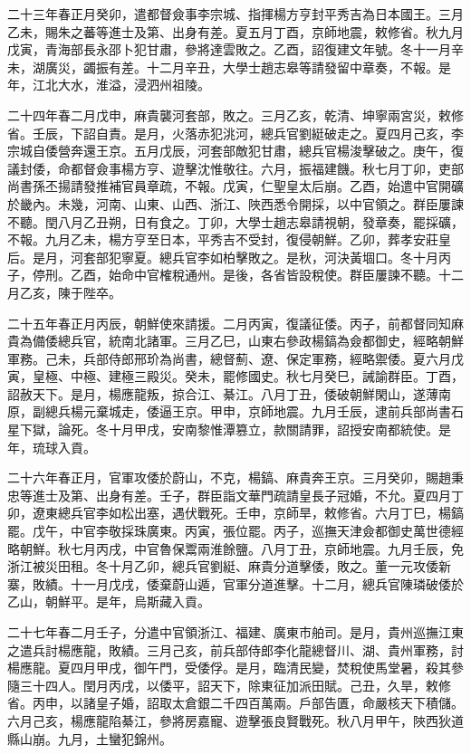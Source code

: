 \begin{pinyinscope}
二十三年春正月癸卯，遣都督僉事李宗城、指揮楊方亨封平秀吉為日本國王。三月乙未，賜朱之蕃等進士及第、出身有差。夏五月丁酉，京師地震，敕修省。秋九月戊寅，青海部長永邵卜犯甘肅，參將達雲敗之。乙酉，詔復建文年號。冬十一月辛未，湖廣災，蠲振有差。十二月辛丑，大學士趙志皋等請發留中章奏，不報。是年，江北大水，淮溢，浸泗州祖陵。

二十四年春二月戊申，麻貴襲河套部，敗之。三月乙亥，乾清、坤寧兩宮災，敕修省。壬辰，下詔自責。是月，火落赤犯洮河，總兵官劉綎破走之。夏四月己亥，李宗城自倭營奔還王京。五月戊辰，河套部敵犯甘肅，總兵官楊浚擊破之。庚午，復議封倭，命都督僉事楊方亨、遊擊沈惟敬往。六月，振福建饑。秋七月丁卯，吏部尚書孫丕揚請發推補官員章疏，不報。戊寅，仁聖皇太后崩。乙酉，始遣中官開礦於畿內。未幾，河南、山東、山西、浙江、陜西悉令開採，以中官領之。群臣屢諫不聽。閏八月乙丑朔，日有食之。丁卯，大學士趙志皋請視朝，發章奏，罷採礦，不報。九月乙未，楊方亨至日本，平秀吉不受封，復侵朝鮮。乙卯，葬孝安莊皇后。是月，河套部犯寧夏。總兵官李如柏擊敗之。是秋，河決黃堌口。冬十月丙子，停刑。乙酉，始命中官榷稅通州。是後，各省皆設稅使。群臣屢諫不聽。十二月乙亥，陳于陛卒。

二十五年春正月丙辰，朝鮮使來請援。二月丙寅，復議征倭。丙子，前都督同知麻貴為備倭總兵官，統南北諸軍。三月乙巳，山東右參政楊鎬為僉都御史，經略朝鮮軍務。己未，兵部侍郎邢玠為尚書，總督薊、遼、保定軍務，經略禦倭。夏六月戊寅，皇極、中極、建極三殿災。癸未，罷修國史。秋七月癸巳，誡諭群臣。丁酉，詔赦天下。是月，楊應龍叛，掠合江、綦江。八月丁丑，倭破朝鮮閑山，遂薄南原，副總兵楊元棄城走，倭逼王京。甲申，京師地震。九月壬辰，逮前兵部尚書石星下獄，論死。冬十月甲戌，安南黎惟潭篡立，款關請罪，詔授安南都統使。是年，琉球入貢。

二十六年春正月，官軍攻倭於蔚山，不克，楊鎬、麻貴奔王京。三月癸卯，賜趙秉忠等進士及第、出身有差。壬子，群臣詣文華門疏請皇長子冠婚，不允。夏四月丁卯，遼東總兵官李如松出塞，遇伏戰死。壬申，京師旱，敕修省。六月丁巳，楊鎬罷。戊午，中官李敬採珠廣東。丙寅，張位罷。丙子，巡撫天津僉都御史萬世德經略朝鮮。秋七月丙戌，中官魯保鬻兩淮餘鹽。八月丁丑，京師地震。九月壬辰，免浙江被災田租。冬十月乙卯，總兵官劉綎、麻貴分道擊倭，敗之。董一元攻倭新寨，敗績。十一月戊戌，倭棄蔚山遁，官軍分道進擊。十二月，總兵官陳璘破倭於乙山，朝鮮平。是年，烏斯藏入貢。

二十七年春二月壬子，分遣中官領浙江、福建、廣東市舶司。是月，貴州巡撫江東之遣兵討楊應龍，敗績。三月己亥，前兵部侍郎李化龍總督川、湖、貴州軍務，討楊應龍。夏四月甲戌，御午門，受倭俘。是月，臨清民變，焚稅使馬堂暑，殺其參隨三十四人。閏月丙戌，以倭平，詔天下，除東征加派田賦。己丑，久旱，敕修省。丙申，以諸皇子婚，詔取太倉銀二千四百萬兩。戶部告匱，命嚴核天下積儲。六月己亥，楊應龍陷綦江，參將房嘉寵、遊擊張良賢戰死。秋八月甲午，陜西狄道縣山崩。九月，土蠻犯錦州。


\end{pinyinscope}
